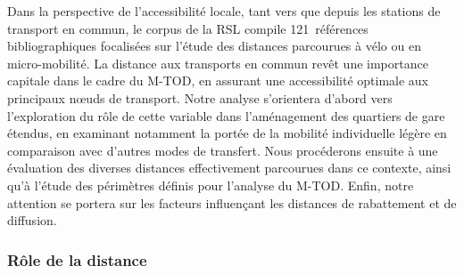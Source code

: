 \begin{refsegment}
Dans la perspective de l'accessibilité locale, tant vers que depuis les stations de transport en commun, le corpus de la \acrshort{RSL} compile 121~références bibliographiques focalisées sur l'étude des distances parcourues à vélo ou en micro-mobilité. La distance aux transports en commun revêt une importance capitale dans le cadre du \acrshort{M-TOD}, en assurant une accessibilité optimale aux principaux nœuds de transport. Notre analyse s'orientera d'abord vers l'exploration du rôle de cette variable dans l'aménagement des quartiers de gare étendus, en examinant notamment la portée de la mobilité individuelle légère en comparaison avec d'autres modes de transfert. Nous procéderons ensuite à une évaluation des diverses distances effectivement parcourues dans ce contexte, ainsi qu'à l'étude des périmètres définis pour l'analyse du \acrshort{M-TOD}. Enfin, notre attention se portera sur les facteurs influençant les distances de rabattement et de diffusion.%

\subsubsection*{Rôle de la distance
    \label{chap2:role-distance}
    }
    

\end{refsegment}
